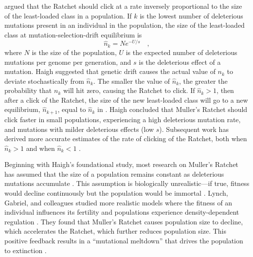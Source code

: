 \documentclass[9pt,lineno]{elife}
\begin{document}
\citet{Haigh_The_1978} argued that the Ratchet should click at a rate inversely proportional to the size of the least-loaded class in a population.  If $k$ is the lowest number of deleterious mutations present in an individual in the population, 
the size of the least-loaded class at mutation-selection-drift equilibrium is
%
\begin{equation}
  \hat n_k = N e^{-U/s} \quad ,
  \label{eq:haigh}
\end{equation}
%
where $N$ is the size of the population, $U$ is the 
expected number of deleterious mutations
per genome per generation, and $s$ is the deleterious effect of a mutation. 
Haigh suggested that genetic drift causes the actual value of $n_k$ to deviate stochastically from $\hat n_k$.  The smaller the value of $\hat n_k$, the greater the probability that $n_k$ will hit zero, causing the Ratchet to click.  
If $\hat n_k > 1$, then after a click of the Ratchet, the size of the new least-loaded class will go to a new equilibrium, $\hat n_{k+1}$, equal to $\hat n_k$ in . 
Haigh concluded that Muller's Ratchet should click faster 
in small populations, 
experiencing a high deleterious mutation rate, 
and mutations with milder deleterious effects (low $s$).
Subsequent work has derived more accurate estimates of the rate of clicking of the Ratchet, both when $\hat n_k > 1$ \citep{Stephan_The_1993, Gordo_On_2000, gor00b, Neher_Fluctuations_2012, met13} and when $\hat n_k < 1$ \citep{Gessler_The_1995, Rouzine_The_2003, Rouzine_The_2008}. 

Beginning with Haigh's foundational study, most research on Muller's Ratchet has assumed that 
the size of a population remains constant as deleterious mutations accumulate \citep[e.g.,][]{Gessler_The_1995, Gordo_On_2000, gor00b, Rouzine_The_2003, met13}.  
This assumption is biologically unrealistic---if true, fitness would decline continuously but the population would be immortal \citep{Lynch_MUTATION_1990, mel91}.  Lynch, Gabriel, and colleagues studied more realistic models where the fitness of an individual influences its fertility and populations experience density-dependent regulation \citep{Lynch_MUTATION_1990, lyn93, Gabriel_MULLER_1993, lyn95}.  They found that Muller's Ratchet causes population size to decline, which accelerates the Ratchet, which further reduces population size.  This positive feedback results in a ``mutational meltdown'' that drives the population to extinction \citep{Lynch_MUTATION_1990, lyn93, Gabriel_MULLER_1993}. 
\end{document}
